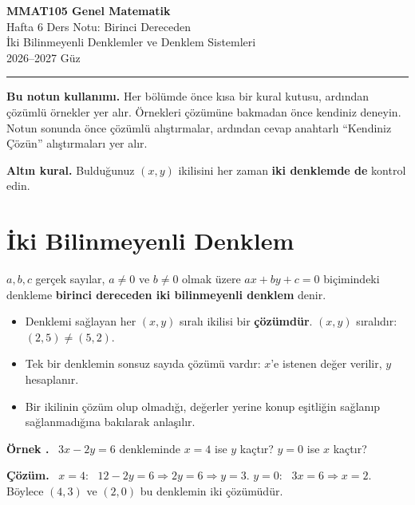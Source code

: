 \documentclass[11pt,a4paper]{article}
\newcounter{ornek}
\newenvironment{ornek}{\refstepcounter{ornek}\par\medskip\noindent\textbf{\color{anamavi}Örnek \theornek.}\ }{\par}
\newenvironment{cozum}{\begin{tcolorbox}[colback=cozumyesil!6,colframe=cozumyesil,boxrule=0.5pt,left=4pt,right=4pt,top=2pt,bottom=2pt,breakable]\textbf{\color{cozumyesil}Çözüm.}\ }{\end{tcolorbox}}
\begin{document}
\begin{minipage}[c]{\textwidth}
{\LARGE\bfseries\color{anamavi} MMAT105 Genel Matematik}\\[4pt]
{\large Hafta 6 Ders Notu: Birinci Dereceden\\ İki Bilinmeyenli Denklemler ve Denklem Sistemleri}\\[6pt]
{\small 2026--2027 Güz}
\end{minipage}

\vspace{4pt}\noindent\textcolor{anamavi}{\rule{\textwidth}{1pt}}

\textbf{Bu notun kullanımı.} Her bölümde önce kısa bir kural kutusu, ardından çözümlü örnekler yer alır. Örnekleri çözümüne bakmadan önce kendiniz deneyin. Notun sonunda önce çözümlü alıştırmalar, ardından cevap anahtarlı ``Kendiniz Çözün'' alıştırmaları yer alır.

\textbf{Altın kural.} Bulduğunuz \((x,y)\) ikilisini her zaman \textbf{iki denklemde de} kontrol edin.

\section{İki Bilinmeyenli Denklem}

\begin{kural}[Tanım]
\(a,b,c\) gerçek sayılar, \(a\neq 0\) ve \(b\neq 0\) olmak üzere \(ax+by+c=0\) biçimindeki denkleme \textbf{birinci dereceden iki bilinmeyenli denklem} denir.
\begin{itemize}[leftmargin=*,itemsep=1pt]
\item Denklemi sağlayan her \((x,y)\) sıralı ikilisi bir \textbf{çözümdür}. \((x,y)\) sıralıdır: \((2,5)\neq(5,2)\).
\item Tek bir denklemin sonsuz sayıda çözümü vardır: \(x\)'e istenen değer verilir, \(y\) hesaplanır.
\item Bir ikilinin çözüm olup olmadığı, değerler yerine konup eşitliğin sağlanıp sağlanmadığına bakılarak anlaşılır.
\end{itemize}
\end{kural}

\begin{ornek}
\(3x-2y=6\) denkleminde \(x=4\) ise \(y\) kaçtır? \(y=0\) ise \(x\) kaçtır?
\end{ornek}
\begin{cozum}
\(x=4\): \ \(12-2y=6\Rightarrow 2y=6\Rightarrow y=3\). \qquad \(y=0\): \ \(3x=6\Rightarrow x=2\).\\
Böylece \((4,3)\) ve \((2,0)\) bu denklemin iki çözümüdür.
\end{cozum}
\end{document}
